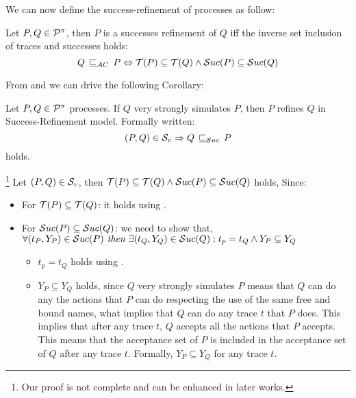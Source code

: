 We can now define the success-refinement of \picalc{} processes as follow:

\begin{definition}
\label{def_Successes_ref}
	Let $P,Q\in\mathcal P^{\pi}$, then $P$ is a {successes refinement} of $Q$ iff the inverse set inclusion of traces and successes holds:
   \[Q \refiAC P \Leftrightarrow  \Traces[P]\subseteq\Traces[Q] \wedge \Successes[P]\subseteq\Successes[Q]\]
\end{definition}

From  and  we can drive the following Corollary: 

\begin{cor}
\label{cor_sim_acceptance_refinement}
Let $P,Q\in\mathcal P^{\pi}$ processes. If $Q$ very strongly simulates $P$, then $P$ refines $Q$ in Success-Refinement model. Formally written:
    \[(P,Q)\in{}\simuv \Rightarrow Q \refiSuc P\]
holds.
\end{cor}%

\begin{prf}\footnote{Our proof is not complete and can be enhanced in later works.}
Let $(P,Q)\in{}\mathcal{S}_v$, then $\Traces[P]\subseteq\Traces[Q] \wedge \Successes[P]\subseteq\Successes[Q]$ holds, Since:
\begin{itemize}
\item For $\Traces[P]\subseteq\Traces[Q]$: it holds using .
\item For $\Successes[P]\subseteq\Successes[Q]$: we need to show that,\\$\forall (t_P, Y_P) \in \Successes[P] \textit{ then } \exists (t_Q, Y_Q) \in \Successes[Q]: t_p = t_Q \wedge Y_P \subseteq Y_Q$
\begin{itemize}
\item $t_p = t_Q$ holds using .
\item $Y_P \subseteq Y_Q$ holds, since $Q$ very strongly simulates $P$ means that $Q$ can do any the actions that $P$ can do respecting the use of the same free and bound names, what implies that $Q$ can do any trace $t$ that $P$ does. This implies that after any trace $t$, $Q$ accepts all the actions that $P$ accepts. This means that the acceptance set of $P$ is included in the acceptance set of $Q$ after any trace $t$. Formally, $Y_P \subseteq Y_Q$ for any trace $t$.
\end{itemize}
\end{itemize}
\end{prf}
